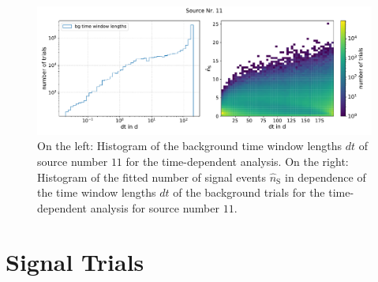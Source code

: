 \begin{figure}
    \centering
    \includegraphics[width=\linewidth]{Plots/05_csky/9_years_gfu_gold_time_dep_bg_dt_and_dt_ns.pdf}
    \caption{On the left: Histogram of the background time window lengths $dt$ of source number $\num{11}$ for the time-dependent analysis. On the right: Histogram of the fitted number of signal events $\hat{n}_\text{S}$ in dependence of the time window lengths $dt$ of the background trials for the time-dependent analysis for source number $\num{11}$.}
    \label{fig:bg_trials_time_dep_time_windows_1}
\end{figure}

\clearpage
\section{Signal Trials}

